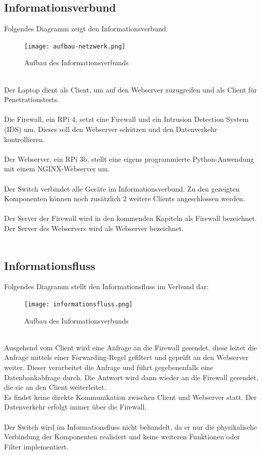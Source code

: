 \documentclass[
    a4paper,
    pagesize,
	pdftex,
    12pt,
]{scrartcl}
\begin{document}
\subsection{Informationsverbund}
Folgendes Diagramm zeigt den Informationsverbund:
\begin{figure}[!ht]
	\centering
	\texttt{[image: aufbau-netzwerk.png]}
	\caption{Aufbau des Informationsverbunds}
	\label{fig:boat1}
\end{figure}
\\
Der Laptop dient als Client, um auf den Webserver zuzugreifen und als Client für  Penetrationstests.  \\ \\
Die Firewall, ein RPi 4, setzt eine Firewall und ein  Intrusion Detection System (IDS) um. Dieses soll den Webserver schützen und den Datenverkehr  kontrollieren.  \\ \\
Der Webserver, ein RPi 3b, stellt eine eigens programmierte Python-Anwendung mit einem NGINX-Webserver um. \\ \\
Der Switch verbindet alle Geräte im Informationsverbund.  Zu den  gezeigten Komponenten können noch zusätzlich  2 weitere  Clients  angeschlossen werden. \\ \\
Der Server der Firewall wird in den kommenden Kapiteln als Firewall bezeichnet. Der Server des Webservers wird als Webserver bezeichnet. \\ \\

\subsection{Informationsfluss}
Folgendes Diagramm stellt den Informationsfluss im Verbund dar:
\begin{figure}[!ht]
	\centering
	\texttt{[image: informationsfluss.png]}
	\caption{Aufbau des Informationsverbunds}
	\label{fig:boat2}
\end{figure}
\\
Ausgehend vom Client wird eine Anfrage an die Firewall gesendet, diese leitet die Anfrage mittels einer Forwarding-Regel gefiltert und geprüft an den Webserver weiter. Dieser verarbeitet die Anfrage und führt gegebenenfalls eine Datenbankabfrage durch. Die Antwort wird dann wieder an die Firewall gesendet, die sie an den Client weiterleitet. \\
Es findet keine direkte Kommunikation zwischen Client und Webserver statt. Der Datenverkehr erfolgt immer über die Firewall.
\\ \\
Der Switch wird im Informationsfluss nicht behandelt, da er nur die physikalische Verbindung der Komponenten realisiert und keine weiteren Funktionen oder Filter implementiert.
\end{document}
